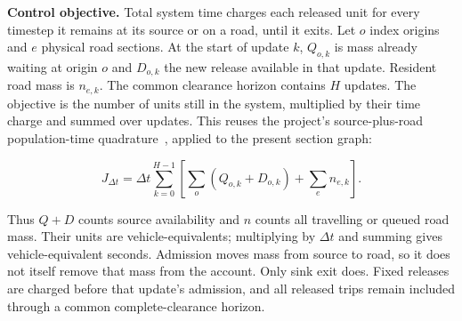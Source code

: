 \documentclass[10pt,a4paper]{article}
\newcommand{\rev}[1]{{\color{revisionred}#1}}
\begin{document}
\textbf{Control objective.} Total system time charges each released unit
for every timestep it remains at its source or on a road, until it exits.
Let $o$ index origins and $e$ physical road sections. At the start of
update $k$, $Q_{o,k}$ is mass already waiting at origin $o$ and
$D_{o,k}$ the new release available in that update. Resident road mass is
$n_{e,k}$. The common clearance horizon contains $H$ updates. The objective
is the number of units still in the system, multiplied by their time
charge and summed over updates.
\rev{This reuses the project's source-plus-road population-time quadrature~\cite{m0}, applied to the present section graph:}
\par
\begin{equation}
 J_{\Delta t}
 =\Delta t\sum_{k=0}^{H-1}
 \left[\sum_o(Q_{o,k}+D_{o,k})+\sum_en_{e,k}\right].
 \label{eq:compact-tst}
\end{equation}

Thus $Q+D$ counts source availability and $n$ counts all travelling or
queued road mass. Their units are vehicle-equivalents; multiplying by
$\Delta t$ and summing gives vehicle-equivalent seconds. Admission moves
mass from source to road, so it does not itself remove that mass from
the account. Only sink exit does. Fixed releases are charged before
that update's admission, and all released trips remain included through
a common complete-clearance horizon.
\end{document}
